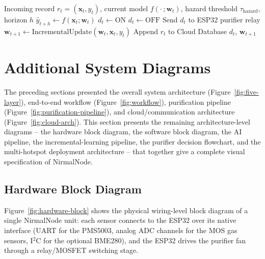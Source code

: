 \begin{algorithm}[htbp]
\caption{Adaptive AI Update and Purifier Decision Engine}
\label{alg:decision-engine}
\begin{algorithmic}[1]
\Require Incoming record $r_t = (\mathbf{x}_t, y_t)$, current model $f(\cdot\,;\mathbf{w}_t)$, hazard threshold $\tau_{\text{hazard}}$, horizon $h$
\State $\hat{y}_{t+h} \leftarrow f(\mathbf{x}_t; \mathbf{w}_t)$ 
    \State $d_t \leftarrow \text{ON}$
\Else
    \State $d_t \leftarrow \text{OFF}$
\EndIf
\State Send $d_t$ to ESP32 purifier relay
\State $\mathbf{w}_{t+1} \leftarrow \text{IncrementalUpdate}(\mathbf{w}_t, \mathbf{x}_t, y_t)$ 
\State Append $r_t$ to Cloud Database
\State \Return $d_t$, $\mathbf{w}_{t+1}$
\end{algorithmic}
\end{algorithm}

\section{Additional System Diagrams}
\label{sec:meth-extra-diagrams}

The preceding sections presented the overall system architecture (Figure~\ref{fig:five-layer}), end-to-end workflow (Figure~\ref{fig:workflow}), purification pipeline (Figure~\ref{fig:purification-pipeline}), and cloud/communication architecture (Figure~\ref{fig:cloud-arch}). This section presents the remaining architecture-level diagrams -- the hardware block diagram, the software block diagram, the AI pipeline, the incremental-learning pipeline, the purifier decision flowchart, and the multi-hotspot deployment architecture -- that together give a complete visual specification of NirmalNode.

\subsection{Hardware Block Diagram}
Figure~\ref{fig:hardware-block} shows the physical wiring-level block diagram of a single NirmalNode unit: each sensor connects to the ESP32 over its native interface (UART for the PMS5003, analog ADC channels for the MOS gas sensors, I$^2$C for the optional BME280), and the ESP32 drives the purifier fan through a relay/MOSFET switching stage.


